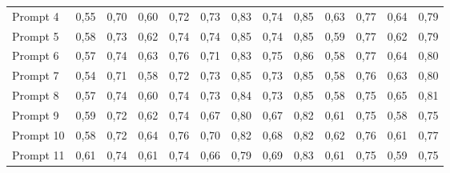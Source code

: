 \begin{tabular}{lrrrrrrrrrrrr}
Prompt 4          & 0,55                  & 0,70                    & 0,60                  & 0,72                    & 0,73                  & 0,83                    & 0,74                  & 0,85                    & 0,63                  & 0,77                    & 0,64                  & 0,79                    \\
Prompt 5          & 0,58                  & 0,73                    & 0,62                  & 0,74                    & 0,74                  & 0,85                    & 0,74                  & 0,85                    & 0,59                  & 0,77                    & 0,62                  & 0,79                    \\
Prompt 6          & 0,57                  & 0,74                    & 0,63                  & 0,76                    & 0,71                  & 0,83                    & 0,75                  & 0,86                    & 0,58                  & 0,77                    & 0,64                  & 0,80                    \\
Prompt 7          & 0,54                  & 0,71                    & 0,58                  & 0,72                    & 0,73                  & 0,85                    & 0,73                  & 0,85                    & 0,58                  & 0,76                    & 0,63                  & 0,80                    \\
Prompt 8          & 0,57                  & 0,74                    & 0,60                  & 0,74                    & 0,73                  & 0,84                    & 0,73                  & 0,85                    & 0,58                  & 0,75                    & 0,65                  & 0,81                    \\
Prompt 9          & 0,59                  & 0,72                    & 0,62                  & 0,74                    & 0,67                  & 0,80                    & 0,67                  & 0,82                    & 0,61                  & 0,75                    & 0,58                  & 0,75                    \\
Prompt 10         & 0,58                  & 0,72                    & 0,64                  & 0,76                    & 0,70                  & 0,82                    & 0,68                  & 0,82                    & 0,62                  & 0,76                    & 0,61                  & 0,77                    \\
Prompt 11         & 0,61                  & 0,74                    & 0,61                  & 0,74                    & 0,66                  & 0,79                    & 0,69                  & 0,83                    & 0,61                  & 0,75                    & 0,59                  & 0,75                    \\

\end{tabular}
